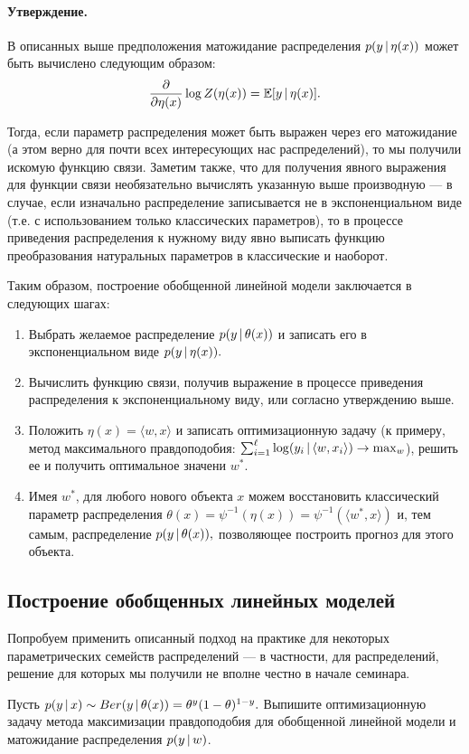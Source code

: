 \documentclass[12pt,a4paper]{article}
\begin{document}
    \paragraph{Утверждение.}
    В описанных выше предположения матожидание распределения $p(y \mspace{3mu}{|}\mspace{3mu} \eta(x))$ может быть вычислено следующим образом:
    \begin{align*}
        \frac{\partial}{\partial \eta(x)} \log Z(\eta(x)) = \mathbb{E}[y \mspace{3mu}{|}\mspace{3mu} \eta(x)].
    \end{align*}
    
    Тогда, если параметр распределения может быть выражен через его матожидание (а этом верно для почти всех интересующих нас распределений), то мы получили искомую функцию связи. Заметим также, что для получения явного выражения для функции связи необязательно вычислять указанную выше производную — в случае, если изначально распределение записывается не в экспоненциальном виде (т.е. с использованием только классических параметров), то в процессе приведения распределения к нужному виду явно выписать функцию преобразования натуральных параметров в классические и наоборот.
    \par Таким образом, построение обобщенной линейной модели заключается в следующих шагах:
    \begin{enumerate}
        \item Выбрать желаемое распределение $p(y \mspace{3mu}{|}\mspace{3mu} \theta(x))$ и записать его в экспоненциальном виде $p(y \mspace{3mu}{|}\mspace{3mu} \eta(x)).$
        \item Вычислить функцию связи, получив выражение в процессе приведения распределения к экспоненциальному виду, или согласно утверждению выше.
        \item Положить $\eta(x) = \langle w, x \rangle$ и записать оптимизационную задачу (к примеру, метод максимального правдоподобия: $\sum_{i=1}^\ell \log (y_i \mspace{3mu}{|}\mspace{3mu} \langle w, x_i \rangle) \to \max_w$), решить ее и получить оптимальное значени $w^*$.
        \item Имея $w^*$, для любого нового объекта $x$ можем восстановить классический параметр распределения $\theta(x) = \psi^{-1} (\eta(x)) = \psi^{-1} (\langle w^*, x \rangle)$ и, тем самым, распределение $p(y \mspace{3mu}{|}\mspace{3mu} \theta(x)),$ позволяющее построить прогноз для этого объекта.
    \end{enumerate}
    
    \subsection{Построение обобщенных линейных моделей}
    \par Попробуем применить описанный подход на практике для некоторых параметрических семейств распределений — в частности, для распределений, решение для которых мы получили не вполне честно в начале семинара.
    \newpage 
    \begin{vkProblem}
        Пусть $p(y \mspace{3mu}{|}\mspace{3mu} x) \sim Ber (y \mspace{3mu}{|}\mspace{3mu} \theta(x)) = \theta^y (1 - \theta)^{1- y}.$ Выпишите оптимизационную задачу метода максимизации правдоподобия для обобщенной линейной модели и матожидание распределения $p(y \mspace{3mu}{|}\mspace{3mu} w)$.
    \end{vkProblem} 
    
\end{document}
